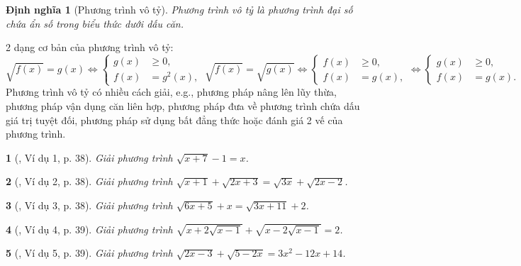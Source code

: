 \documentclass{article}
\newtheorem{baitoan}{}%
\newtheorem{dinhnghia}{Định nghĩa}
\begin{document}
\begin{dinhnghia}[Phương trình vô tỷ]
	{\rm Phương trình vô tỷ} là phương trình đại số chứa ẩn số trong biểu thức dưới dấu căn.
\end{dinhnghia}
2 dạng cơ bản của phương trình vô tỷ:
\begin{equation*}
	\boxed{\sqrt{f(x)} = g(x)\Leftrightarrow\left\{\begin{split}
		g(x)&\ge0,\\
		f(x) &= g^2(x),
	\end{split}\right.\ \sqrt{f(x)} = \sqrt{g(x)}\Leftrightarrow\left\{\begin{split}
	f(x)&\ge0,\\
	f(x) &= g(x),
	\end{split}\right.\Leftrightarrow\left\{\begin{split}
		g(x)&\ge0,\\
		f(x) &= g(x).
	\end{split}\right.}
\end{equation*}
Phương trình vô tỷ có nhiều cách giải, e.g., phương pháp nâng lên lũy thừa, phương pháp vận dụng căn liên hợp, phương pháp đưa về phương trình chứa dấu giá trị tuyệt đối, phương pháp sử dụng bất đẳng thức hoặc đánh giá 2 vế của phương trình.

\begin{baitoan}[\cite{Binh_boi_duong_Toan_9_tap_1}, Ví dụ 1, p. 38]
	Giải phương trình $\sqrt{x + 7} - 1 = x$.
\end{baitoan}

\begin{baitoan}[\cite{Binh_boi_duong_Toan_9_tap_1}, Ví dụ 2, p. 38]
	Giải phương trình $\sqrt{x + 1} + \sqrt{2x + 3} = \sqrt{3x} + \sqrt{2x - 2}$.
\end{baitoan}

\begin{baitoan}[\cite{Binh_boi_duong_Toan_9_tap_1}, Ví dụ 3, p. 38]
	Giải phương trình $\sqrt{6x + 5} + x = \sqrt{3x + 11} + 2$.
\end{baitoan}

\begin{baitoan}[\cite{Binh_boi_duong_Toan_9_tap_1}, Ví dụ 4, p. 39]
	Giải phương trình $\sqrt{x + 2\sqrt{x - 1}} + \sqrt{x - 2\sqrt{x - 1}} = 2$.
\end{baitoan}

\begin{baitoan}[\cite{Binh_boi_duong_Toan_9_tap_1}, Ví dụ 5, p. 39]
	Giải phương trình $\sqrt{2x - 3} + \sqrt{5 - 2x} = 3x^2 - 12x + 14$.
\end{baitoan}
\end{document}
